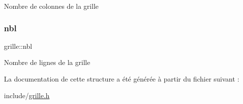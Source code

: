 Nombre de colonnes de la grille \mbox{\label{structgrille_a038d466056834f499a729c71bc8024d2}} 
\subsubsection{\texorpdfstring{nbl}{nbl}}
{\footnotesize\ttfamily grille\+::nbl}

Nombre de lignes de la grille 

La documentation de cette structure a été générée à partir du fichier suivant \+:\begin{DoxyCompactItemize}
\item 
include/\hyperlink{grille_8h}{grille.\+h}\end{DoxyCompactItemize}
